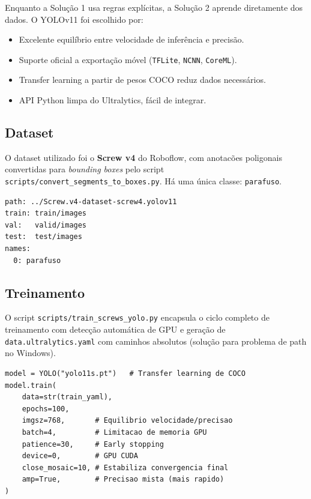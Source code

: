 \documentclass[12pt,a4paper]{article}
\begin{document}
Enquanto a Solu\c{c}\~ao 1 usa regras expl\'icitas, a Solu\c{c}\~ao 2 aprende
diretamente dos dados. O YOLOv11 foi escolhido por:

\begin{itemize}[leftmargin=*]
  \item Excelente equil\'ibrio entre velocidade de infer\^encia e precis\~ao.
  \item Suporte oficial a exporta\c{c}\~ao m\'ovel (\texttt{TFLite}, \texttt{NCNN},
        \texttt{CoreML}).
  \item Transfer learning a partir de pesos COCO reduz dados necess\'arios.
  \item API Python limpa do Ultralytics, f\'acil de integrar.
\end{itemize}

\subsection{Dataset}

O dataset utilizado foi o \textbf{Screw v4} do Roboflow, com anotac\~oes poligonais
convertidas para \emph{bounding boxes} pelo script
\texttt{scripts/convert\_segments\_to\_boxes.py}. H\'a uma \'unica classe:
\texttt{parafuso}.

\begin{lstlisting}[caption={Configura\c{c}\~ao do dataset (\texttt{data.yaml})}]
path: ../Screw.v4-dataset-screw4.yolov11
train: train/images
val:   valid/images
test:  test/images
names:
  0: parafuso
\end{lstlisting}

\subsection{Treinamento}

O script \texttt{scripts/train\_screws\_yolo.py} encapsula o ciclo completo de
treinamento com detec\c{c}\~ao autom\'atica de GPU e gera\c{c}\~ao de
\texttt{data.ultralytics.yaml} com caminhos absolutos (solu\c{c}\~ao para
problema de path no Windows).

\begin{lstlisting}[caption={Treinamento do modelo YOLOv11}]
model = YOLO("yolo11s.pt")   # Transfer learning de COCO
model.train(
    data=str(train_yaml),
    epochs=100,
    imgsz=768,       # Equilibrio velocidade/precisao
    batch=4,         # Limitacao de memoria GPU
    patience=30,     # Early stopping
    device=0,        # GPU CUDA
    close_mosaic=10, # Estabiliza convergencia final
    amp=True,        # Precisao mista (mais rapido)
)
\end{lstlisting}
\end{document}
